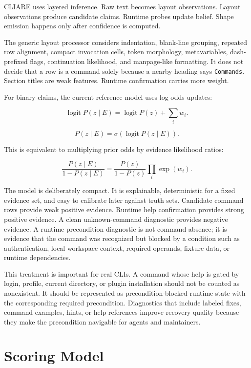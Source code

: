 \documentclass[11pt]{article}
\begin{document}
CLIARE uses layered inference. Raw text becomes layout observations. Layout observations produce candidate claims. Runtime probes update belief. Shape emission happens only after confidence is computed.

The generic layout processor considers indentation, blank-line grouping, repeated row alignment, compact invocation cells, token morphology, metavariables, dash-prefixed flags, continuation likelihood, and manpage-like formatting. It does not decide that a row is a command solely because a nearby heading says \texttt{Commands}. Section titles are weak features. Runtime confirmation carries more weight.

For binary claims, the current reference model uses log-odds updates:

\[
\operatorname{logit} P(z \mid E)
  = \operatorname{logit} P(z) + \sum_i w_i .
\]

\[
P(z \mid E)
  = \sigma\!\left(\operatorname{logit} P(z \mid E)\right).
\]

This is equivalent to multiplying prior odds by evidence likelihood ratios:

\[
\frac{P(z \mid E)}{1 - P(z \mid E)}
  =
  \frac{P(z)}{1 - P(z)}
  \prod_i \exp(w_i).
\]

The model is deliberately compact. It is explainable, deterministic for a fixed evidence set, and easy to calibrate later against truth sets. Candidate command rows provide weak positive evidence. Runtime help confirmation provides strong positive evidence. A clean unknown-command diagnostic provides negative evidence. A runtime precondition diagnostic is not command absence; it is evidence that the command was recognized but blocked by a condition such as authentication, local workspace context, required operands, fixture data, or runtime dependencies.

This treatment is important for real CLIs. A command whose help is gated by login, profile, current directory, or plugin installation should not be counted as nonexistent. It should be represented as precondition-blocked runtime state with the corresponding required precondition. Diagnostics that include labeled fixes, command examples, hints, or help references improve recovery quality because they make the precondition navigable for agents and maintainers.

\section{Scoring Model}
\end{document}

